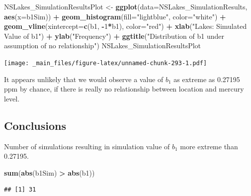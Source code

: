 \documentclass[]{book}
\newenvironment{Shaded}{\begin{snugshade}}{\end{snugshade}}
\newcommand{\KeywordTok}[1]{\textcolor[rgb]{0.13,0.29,0.53}{\textbf{#1}}}
\newcommand{\DataTypeTok}[1]{\textcolor[rgb]{0.13,0.29,0.53}{#1}}
\newcommand{\DecValTok}[1]{\textcolor[rgb]{0.00,0.00,0.81}{#1}}
\newcommand{\StringTok}[1]{\textcolor[rgb]{0.31,0.60,0.02}{#1}}
\newcommand{\OperatorTok}[1]{\textcolor[rgb]{0.81,0.36,0.00}{\textbf{#1}}}
\newcommand{\NormalTok}[1]{#1}
\begin{document}
\begin{Shaded}
\begin{Highlighting}[]
\NormalTok{NSLakes_SimulationResultsPlot <-}\StringTok{ }\KeywordTok{ggplot}\NormalTok{(}\DataTypeTok{data=}\NormalTok{NSLakes_SimulationResults, }\KeywordTok{aes}\NormalTok{(}\DataTypeTok{x=}\NormalTok{b1Sim)) }\OperatorTok{+}\StringTok{ }
\StringTok{  }\KeywordTok{geom_histogram}\NormalTok{(}\DataTypeTok{fill=}\StringTok{"lightblue"}\NormalTok{, }\DataTypeTok{color=}\StringTok{"white"}\NormalTok{) }\OperatorTok{+}\StringTok{ }
\StringTok{  }\KeywordTok{geom_vline}\NormalTok{(}\DataTypeTok{xintercept=}\KeywordTok{c}\NormalTok{(b1, }\OperatorTok{-}\DecValTok{1}\OperatorTok{*}\NormalTok{b1), }\DataTypeTok{color=}\StringTok{"red"}\NormalTok{) }\OperatorTok{+}\StringTok{ }
\StringTok{  }\KeywordTok{xlab}\NormalTok{(}\StringTok{"Lakes: Simulated Value of b1"}\NormalTok{) }\OperatorTok{+}\StringTok{ }\KeywordTok{ylab}\NormalTok{(}\StringTok{"Frequency"}\NormalTok{) }\OperatorTok{+}\StringTok{ }
\StringTok{  }\KeywordTok{ggtitle}\NormalTok{(}\StringTok{"Distribution of b1 under assumption of no relationship"}\NormalTok{)}
\NormalTok{NSLakes_SimulationResultsPlot}
\end{Highlighting}
\end{Shaded}

\texttt{[image: \_main\_files/figure-latex/unnamed-chunk-293-1.pdf]}

It appears unlikely that we would observe a value of \(b_1\) as extreme
as 0.27195 ppm by chance, if there is really no relationship between
location and mercury level.

\subsection{Conclusions}\label{conclusions}

Number of simulations resulting in simulation value of \(b_1\) more
extreme than 0.27195.

\begin{Shaded}
\begin{Highlighting}[]
\KeywordTok{sum}\NormalTok{(}\KeywordTok{abs}\NormalTok{(b1Sim) }\OperatorTok{>}\StringTok{ }\KeywordTok{abs}\NormalTok{(b1))}
\end{Highlighting}
\end{Shaded}

\begin{verbatim}
## [1] 31
\end{verbatim}
\end{document}

